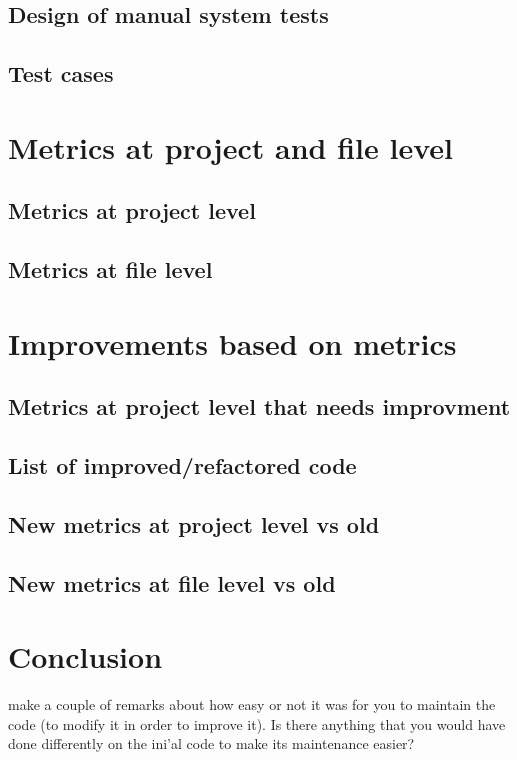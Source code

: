 \documentclass{article}
\begin{document}
	\subsection{Design of manual system tests}


	\subsection{Test cases}


\section{Metrics at project and file level}

\subsection{Metrics at project level}

\subsection{Metrics at file level}

\section{Improvements based on metrics}

\subsection{Metrics at project level that needs improvment}

\subsection{List of improved/refactored code}

\subsection{New metrics at project level vs old}

\subsection{New metrics at file level vs old}

\section{Conclusion}
make a couple of remarks about how easy or not it was for you to maintain the code
(to modify it in order to improve it). Is there anything that you would have done differently on
the ini'al code to make its maintenance easier?
\end{document}
